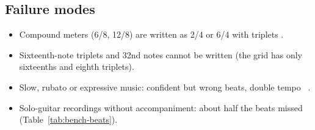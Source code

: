 \subsection{Failure modes}
\begin{itemize}
\item Compound meters (6/8, 12/8) are written as 2/4 or 6/4 with triplets
  \measured.
\item Sixteenth-note triplets and 32nd notes cannot be written (the grid has
  only sixteenths and eighth triplets).
\item Slow, rubato or expressive music: confident but wrong beats, double
  tempo~\cite{ahn2026smc} \reported.
\item Solo-guitar recordings without accompaniment: about half the beats
  missed (Table~\ref{tab:bench-beats}).
\end{itemize}

